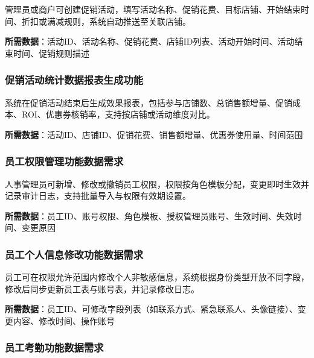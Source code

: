\documentclass[]{article}
\begin{document}
管理员或商户可创建促销活动，填写活动名称、促销花费、目标店铺、开始结束时间、折扣或满减规则，系统自动推送至关联店铺。

\textbf{所需数据}：活动ID、活动名称、促销花费、店铺ID列表、活动开始时间、活动结束时间、促销规则描述

\hypertarget{ux4fc3ux9500ux6d3bux52a8ux7edfux8ba1ux6570ux636eux62a5ux8868ux751fux6210ux529fux80fd}{%
  \subsubsection{促销活动统计数据报表生成功能}\label{ux4fc3ux9500ux6d3bux52a8ux7edfux8ba1ux6570ux636eux62a5ux8868ux751fux6210ux529fux80fdux6570ux636eux9700ux6c42}}

系统在促销活动结束后生成效果报表，包括参与店铺数、总销售额增量、促销成本、ROI、优惠券核销率，支持按店铺或活动维度对比。

\textbf{所需数据}：活动ID、店铺ID、促销花费、销售额增量、优惠券使用量、时间范围

\hypertarget{ux5458ux5de5ux6743ux9650ux7ba1ux7406ux529fux80fdux6570ux636eux9700ux6c42}{%
  \subsubsection{员工权限管理功能数据需求}\label{ux5458ux5de5ux6743ux9650ux7ba1ux7406ux529fux80fdux6570ux636eux9700ux6c42}}

人事管理员可新增、修改或撤销员工权限，权限按角色模板分配，变更即时生效并记录审计日志，支持批量导入与权限有效期设置。

\textbf{所需数据}：员工ID、账号权限、角色模板、授权管理员账号、生效时间、失效时间、变更原因

\hypertarget{ux5458ux5de5ux4e2aux4ebaux4fe1ux606fux4feeux6539ux529fux80fdux6570ux636eux9700ux6c42}{%
  \subsubsection{员工个人信息修改功能数据需求}\label{ux5458ux5de5ux4e2aux4ebaux4fe1ux606fux4feeux6539ux529fux80fdux6570ux636eux9700ux6c42}}

员工可在权限允许范围内修改个人非敏感信息，系统根据身份类型开放不同字段，修改后同步更新员工表与账号表，并记录修改日志。

\textbf{所需数据}：员工ID、可修改字段列表（如联系方式、紧急联系人、头像链接）、变更内容、修改时间、操作账号

\hypertarget{ux5458ux5de5ux8003ux52e4ux529fux80fdux6570ux636eux9700ux6c42}{%
  \subsubsection{员工考勤功能数据需求}\label{ux5458ux5de5ux8003ux52e4ux529fux80fdux6570ux636eux9700ux6c42}}
\end{document}

